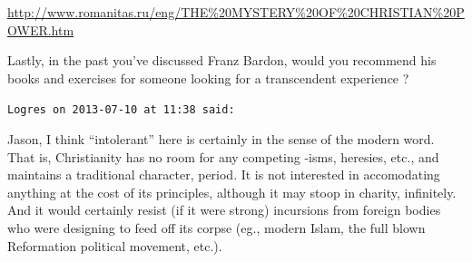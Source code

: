 \begin{footnotesize}
\begin{sffamily}
\url{http://www.romanitas.ru/eng/THE\%20MYSTERY\%20OF\%20CHRISTIAN\%20POWER.htm}


Lastly, in the past you've discussed Franz Bardon, would you recommend his books and exercises for someone looking for a transcendent experience ?

\hfill

\texttt{Logres on 2013-07-10 at 11:38 said:}

Jason, I think ``intolerant'' here is certainly in the sense of the modern word. That is, Christianity has no room for any competing -isms, heresies, etc., and maintains a traditional character, period. It is not interested in accomodating anything at the cost of its principles, although it may stoop in charity, infinitely. And it would certainly resist (if it were strong) incursions from foreign bodies who were designing to feed off its corpse (eg., modern Islam, the full blown Reformation political movement, etc.).

\hfill

\end{sffamily}
\end{footnotesize}

